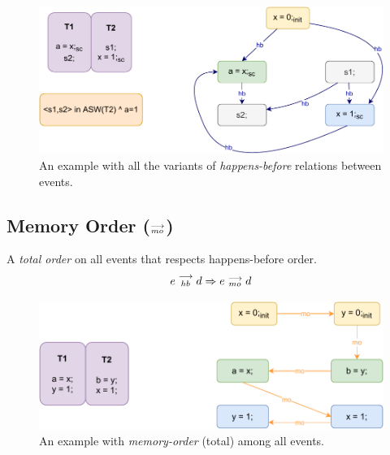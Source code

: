         \begin{figure}[H]
            \centering
            \includegraphics[scale=0.7]{4.ECMAScriptMemoryModel/Happens-before.pdf}
            \caption{An example with all the variants of \textit{happens-before} relations between events.}
        \end{figure}
    
    \subsection{Memory Order ($\stackrel{\longrightarrow}{_{mo}}$)}
        A \textit{total order} on all events that respects happens-before order. 
        \begin{align*}
            e\stackrel{\longrightarrow}{_{hb}}d \Rightarrow{} e\stackrel{\longrightarrow}{_{mo}}d    
        \end{align*}
        
        \begin{figure}[H]
            \centering
            \includegraphics[scale=0.7]{4.ECMAScriptMemoryModel/MemoryOrder.pdf}
            \caption{An example with \textit{memory-order} (total) among all events.}
        \end{figure}


